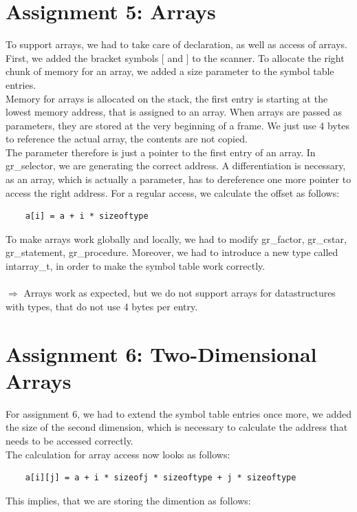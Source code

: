 \documentclass[a4paper,12pt]{article}
\begin{document}
\section{Assignment 5: Arrays}
To support arrays, we had to take care of declaration, as well as access of arrays. First, we added the bracket symbols $[$ and $]$ to the scanner. To allocate the right chunk of memory for an array, we added a size parameter to the symbol table entries.\\Memory for arrays is allocated on the stack, the first entry is starting at the lowest memory address, that is assigned to an array. When arrays are passed as parameters, they are stored at the very beginning of a frame. We just use 4 bytes to reference the actual array, the contents are not copied.\\The parameter therefore is just a pointer to the first entry of an array. In gr\_selector, we are generating the correct address. A differentiation is necessary, as an array, which is actually a parameter, has to dereference one more pointer to access the right address. For a regular access, we calculate the offset as follows: 
\begin{verbatim}
	a[i] = a + i * sizeoftype
\end{verbatim}
To make arrays work globally and locally, we had to modify gr\_factor, gr\_cstar, gr\_statement, gr\_procedure. Moreover, we had to introduce a new type called intarray\_t, in order to make the symbol table work correctly.\\\\
$\Rightarrow$ Arrays work as expected, but we do not support arrays for datastructures with types, that do not use 4 bytes per entry. 

\section{Assignment 6: Two-Dimensional Arrays}
For assignment 6, we had to extend the symbol table entries once more, we added the size of the second dimension, which is necessary to calculate the address that needs to be accessed correctly. \\The calculation for array access now looks as follows:
\begin{verbatim}
	a[i][j] = a + i * sizeofj * sizeoftype + j * sizeoftype
\end{verbatim}
This implies, that we are storing the dimention as follows:
\end{document}

